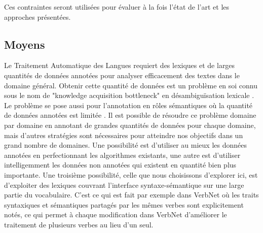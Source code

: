 Ces contraintes seront utilisées pour évaluer à la fois l'état de l'art et les
approches présentées.

\subsection{Moyens}
\label{objectifs_these}


Le Traitement Automatique des Langues requiert des lexiques et de larges
quantités de données annotées pour analyser efficacement des textes dans le
domaine général. Obtenir cette quantité de données est un problème en soi connu
sous le nom de "knowledge acquisition bottleneck" en désambiguïsation lexicale
\citep{gale1992method,navigli2009word}. Le problème se pose aussi pour
l'annotation en rôles sémantiques où la quantité de données annotées est
limitée \citep[section 1]{das2012structure}. Il est possible de résoudre ce
problème domaine par domaine en annotant de grandes quantités de données pour
chaque domaine, mais d'autres stratégies sont nécessaires pour atteindre nos
objectifs dans un grand nombre de domaines. Une possibilité est d'utiliser au
mieux les données annotées en perfectionnant les algorithmes existants, une
autre est d'utiliser intelligemment les données non annotées qui existent en
quantité bien plus importante. Une troisième possibilité, celle que nous
choisissons d'explorer ici, est d'exploiter des lexiques couvrant l'interface
syntaxe-sémantique sur une large partie du vocabulaire. C'est ce qui est fait
par exemple dans VerbNet où les traits syntaxiques et sémantiques partagés par
les mêmes verbes sont explicitement notés, ce qui permet à chaque modification
dans VerbNet d'améliorer le traitement de plusieurs verbes au lieu d'un seul.


